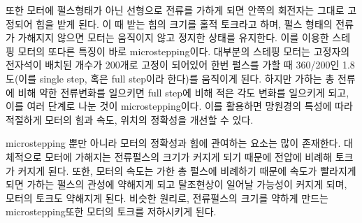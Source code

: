 또한 모터에 펄스형태가 아닌 선형으로 전류를 가하게 되면 안쪽의 회전자는 그대로 고정되어 힘을 받게 된다. 이 때 받는 힘의 크기를 홀적 토크라고 하며, 펄스 형태의 전류가 가해지지 않으면 모터는 움직이지 않고 정지한 상태를 유지한다. 이를 이용한 스테핑 모터의 또다른 특징이 바로 microstepping이다. 대부분의 스테핑 모터는 고정자의 전자석이 배치된 개수가 200개로 고정이 되어있어 한번 펄스를 가할 때 360/200인 1.8도(이를 single step, 혹은 full step이라 한다)를 움직이게 된다. 하지만 가하는 총 전류에 비해 약한 전류변화를 일으키면 full step에 비해 적은 각도 변화를 일으키게 되고, 이를 여러 단계로 나눈 것이 microstepping이다. 이를 활용하면 망원경의 특성에 따라 적절하게 모터의 힘과 속도, 위치의 정확성을 개선할 수 있다.

microstepping 뿐만 아니라 모터의 정확성과 힘에 관여하는 요소는 많이 존재한다. 대체적으로  모터에 가해지는 전류펄스의 크기가 커지게 되기 때문에 전압에 비례해 토크가 커지게 된다. 또한, 모터의 속도는 가한 총 펄스에 비례하기 때문에 속도가 빨라지게 되면 가하는 펄스의 관성에 약해지게 되고 탈조현상이 일어날 가능성이 커지게 되며, 모터의 토크도 약해지게 된다. 비슷한 원리로, 전류펄스의 크기를 약하게 만드는 microstepping또한 모터의 토크를 저하시키게 된다.



